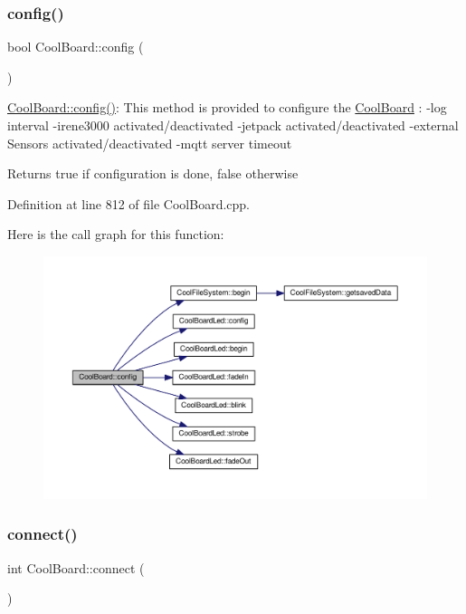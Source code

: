 \subsubsection{\texorpdfstring{config()}{config()}}
{\footnotesize\ttfamily bool Cool\+Board\+::config (\begin{DoxyParamCaption}{ }\end{DoxyParamCaption})}

\hyperlink{class_cool_board_a583a874c09c07e70a6eb9229fc4beddb}{Cool\+Board\+::config()}\+: This method is provided to configure the \hyperlink{class_cool_board}{Cool\+Board} \+: -\/log interval -\/irene3000 activated/deactivated -\/jetpack activated/deactivated -\/external Sensors activated/deactivated -\/mqtt server timeout

\begin{DoxyReturn}{Returns}
true if configuration is done, false otherwise 
\end{DoxyReturn}


Definition at line 812 of file Cool\+Board.\+cpp.

Here is the call graph for this function\+:
\nopagebreak
\begin{figure}[H]
\begin{center}
\leavevmode
\includegraphics[width=350pt]{class_cool_board_a583a874c09c07e70a6eb9229fc4beddb_cgraph}
\end{center}
\end{figure}
\mbox{\label{class_cool_board_a519de78b807f8ec6463ff484eb925918}} 
\subsubsection{\texorpdfstring{connect()}{connect()}}
{\footnotesize\ttfamily int Cool\+Board\+::connect (\begin{DoxyParamCaption}{ }\end{DoxyParamCaption})}

